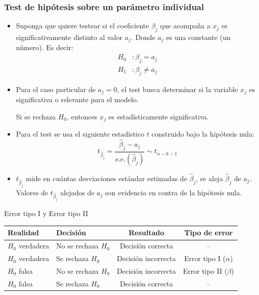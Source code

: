 \documentclass{beamer}
\begin{document}
\begin{frame}[shrink=10]
\frametitle{Test de hipótesis sobre un parámetro individual}
\begin{itemize}
    \item Suponga que quiere testear si el coeficiente $\beta_j$ que acompaña a $x_j$ es significativamente distinto al valor $a_j$. Donde $a_j$ es una constante (un número). Es decir:
    \begin{align*}
        H_0 &: \beta_j = a_j \\
        H_1 &: \beta_j \neq a_j
    \end{align*}
    \item {\color{red} Para el caso particular de $a_j = 0$, el test busca determinar si la variable $x_j$ es significativa o relevante para el modelo.

     Si se rechaza $H_0$, entonces $x_j$ es estadísticamente significativa.}
        
    \item Para el test se usa el siguiente estadístico $t$ construido bajo la hipótesis nula:
    $$t_{\hat{\beta}_j} = \frac{\hat{\beta}_j - a_j}{s.e.(\hat{\beta}_j)} \sim t_{n-k-1}$$
    \item $t_{\hat{\beta}_j}$ mide en cuántas desviaciones estándar estimadas de $\hat{\beta}_j$, se aleja $\hat{\beta}_j$ de $a_j$. Valores de $t_{\hat{\beta}_j}$ alejados de $a_j$ son evidencia en contra de la hipótesis nula.
\end{itemize}
\end{frame}

\begin{frame}{Error tipo I y Error tipo II}

\begin{table}[h!]
\centering
\begin{tabular}{@{}llcc@{}}
\toprule
\textbf{Realidad} & \textbf{Decisión} & \textbf{Resultado} & \textbf{Tipo de error} \\ \midrule
$H_0$ verdadera & No se rechaza $H_0$ & Decisión correcta & -- \\
$H_0$ verdadera & Se rechaza $H_0$ & Decisión incorrecta & {\color{red}Error tipo I ($\alpha$) }\\
$H_0$ falsa     & No se rechaza $H_0$ & Decisión incorrecta & {\color{red}Error tipo II ($\beta$) }\\
$H_0$ falsa     & Se rechaza $H_0$    & Decisión correcta & -- \\
\bottomrule
\end{tabular}
\end{table}

    
\end{frame}
\end{document}
